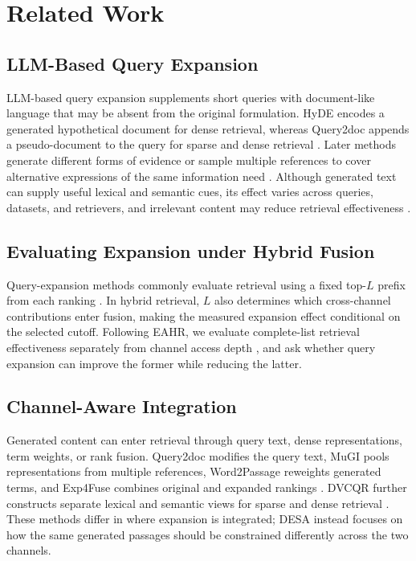 \section{Related Work}
\label{sec:related-work}

\subsection{LLM-Based Query Expansion}

LLM-based query expansion supplements short queries with document-like
language that may be absent from the original formulation. HyDE encodes a
generated hypothetical document for dense retrieval, whereas Query2doc appends
a pseudo-document to the query for sparse and dense retrieval
\citep{gao-etal-2023-precise,wang-etal-2023-query2doc}. Later methods generate
different forms of evidence or sample multiple references to cover alternative
expressions of the same information need
\citep{jagerman-etal-2023-query-expansion,zhang-etal-2024-exploring-best}.
Although generated text can supply useful lexical and semantic cues, its effect
varies across queries, datasets, and retrievers, and irrelevant content may
reduce retrieval effectiveness \citep{weller-etal-2024-generative}.

\subsection{Evaluating Expansion under Hybrid Fusion}

Query-expansion methods commonly evaluate retrieval using a fixed top-$L$
prefix from each ranking
\citep{zhang-etal-2024-exploring-best,liu-zhang-2025-exp4fuse}. In hybrid
retrieval, $L$ also determines which cross-channel contributions enter fusion,
making the measured expansion effect conditional on the selected cutoff.
Following EAHR, we evaluate complete-list retrieval effectiveness separately from
channel access depth \citep{zhang2026exact}, and ask whether query expansion can
improve the former while reducing the latter.

\subsection{Channel-Aware Integration}

Generated content can enter retrieval through query text, dense
representations, term weights, or rank fusion. Query2doc modifies the query
text, MuGI pools representations from multiple references, Word2Passage
reweights generated terms, and Exp4Fuse combines original and expanded
rankings
\citep{wang-etal-2023-query2doc,zhang-etal-2024-exploring-best,choi-etal-2025-word2passage,liu-zhang-2025-exp4fuse}.
DVCQR further constructs separate lexical and semantic views for sparse and
dense retrieval \citep{li-etal-2026-dvcqr}. These methods differ in where
expansion is integrated; DESA instead focuses on how the same generated passages should
be constrained differently across the two channels.

